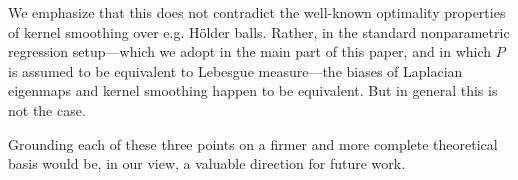 \begin{itemize}
	We emphasize that this does not contradict the well-known optimality properties of kernel smoothing over e.g. H\"{o}lder balls. Rather, in the standard nonparametric regression setup---which we adopt in the main part of this paper, and in which $P$ is assumed to be equivalent to Lebesgue measure---the biases of Laplacian eigenmaps and kernel smoothing happen to be equivalent. But in general this is not the case.
\end{itemize}
Grounding each of these three points on a firmer and more complete theoretical basis would be, in our view, a valuable direction for future work.